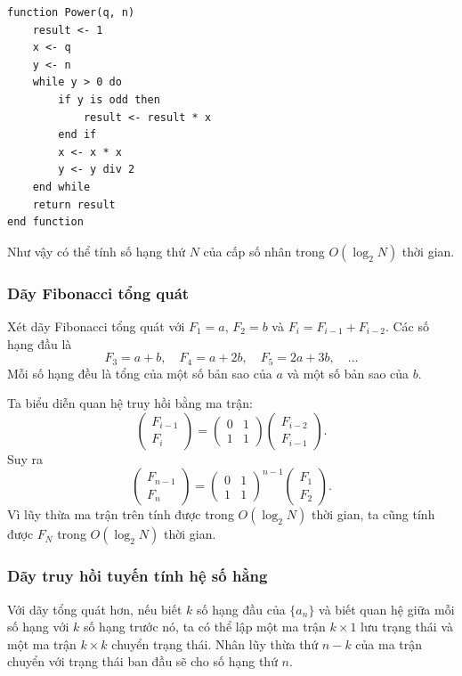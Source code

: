\documentclass[11pt]{article}
\begin{document}
\begin{lstlisting}
function Power(q, n)
    result <- 1
    x <- q
    y <- n
    while y > 0 do
        if y is odd then
            result <- result * x
        end if
        x <- x * x
        y <- y div 2
    end while
    return result
end function
\end{lstlisting}

Như vậy có thể tính số hạng thứ $N$ của cấp số nhân trong $O(\log_2 N)$ thời
gian.

\subsubsection{Dãy Fibonacci tổng quát}

Xét dãy Fibonacci tổng quát với $F_1=a$, $F_2=b$ và
$F_i=F_{i-1}+F_{i-2}$. Các số hạng đầu là
\[
  F_3=a+b,\quad
  F_4=a+2b,\quad
  F_5=2a+3b,\quad \ldots
\]
Mỗi số hạng đều là tổng của một số bản sao của $a$ và một số bản sao của $b$.

Ta biểu diễn quan hệ truy hồi bằng ma trận:
\[
  \begin{pmatrix}F_{i-1}\\F_i\end{pmatrix}
  =
  \begin{pmatrix}0&1\\1&1\end{pmatrix}
  \begin{pmatrix}F_{i-2}\\F_{i-1}\end{pmatrix}.
\]
Suy ra
\[
  \begin{pmatrix}F_{n-1}\\F_n\end{pmatrix}
  =
  \begin{pmatrix}0&1\\1&1\end{pmatrix}^{n-1}
  \begin{pmatrix}F_1\\F_2\end{pmatrix}.
\]
Vì lũy thừa ma trận trên tính được trong $O(\log_2 N)$ thời gian, ta cũng tính
được $F_N$ trong $O(\log_2 N)$ thời gian.

\subsubsection{Dãy truy hồi tuyến tính hệ số hằng}

Với dãy tổng quát hơn, nếu biết $k$ số hạng đầu của $\{a_n\}$ và biết quan hệ
giữa mỗi số hạng với $k$ số hạng trước nó, ta có thể lập một ma trận
$k\times 1$ lưu trạng thái và một ma trận $k\times k$ chuyển trạng thái. Nhân
lũy thừa thứ $n-k$ của ma trận chuyển với trạng thái ban đầu sẽ cho số hạng
thứ $n$.
\end{document}
